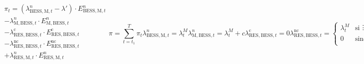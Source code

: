 \begin{subequations}%
  \label{eq:beneficio}

  \begin{equation}
    \begin{split}
      \pi_{t}
      = (\lambda^{n}_{\text{BESS}, \text{M}, t} - \lambda')
      \cdot E^{n}_{\text{BESS}, \text{M}, t}\\
      - \lambda^{n}_{\text{M}, \text{BESS}, t}
      \cdot E^{n}_{\text{M}, \text{BESS}, t}\\
      - \lambda^{\text{c}}_{\text{RES}, \text{BESS}, t}
      \cdot E^{\text{c}}_{\text{RES}, \text{BESS}, t}\\
      - \lambda^{\text{nc}}_{\text{RES}, \text{BESS}, t}
      \cdot E^{\text{nc}}_{\text{RES}, \text{BESS}, t}\\
      + \lambda^{n}_{\text{RES}, \text{M}, t}
      \cdot E^{n}_{\text{RES}, \text{M}, t}\\
    \end{split}
  \end{equation}

  \begin{equation}
    \pi = \sum_{t = t_{1}}^{T} \pi_{t}
  \end{equation}

  \begin{equation}
    \lambda^{n}_{\text{BESS}, \text{M}, t} = \lambda^{M}_{t}
  \end{equation}

  \begin{equation}
    \lambda^{n}_{\text{M}, \text{BESS}, t} = \lambda^{M}_{t} + c
  \end{equation}

  \begin{equation}
    \lambda^{\text{c}}_{\text{RES}, \text{BESS}, t} = 0
  \end{equation}

  \begin{equation}
    \lambda^{\text{nc}}_{\text{RES}, \text{BESS}, t} =
    \begin{cases}
      \lambda^{M}_{t} & \text{si } \exists \, \gamma \land \lambda^{M}_{t} \ge \lambda^{O}_{\text{RES}, t} \\
      0               & \text{sino}                                                                        \\
    \end{cases}
  \end{equation}

  \begin{equation}
    \lambda^{n}_{\text{RES}, \text{M}, t} =
    \begin{cases}
      \lambda^{M}_{t} & \text{si } \lambda^{M}_{t} \ge \lambda^{O}_{\text{RES}, t} \\
      0               & \text{sino}                                                \\
    \end{cases}
  \end{equation}

\end{subequations}

